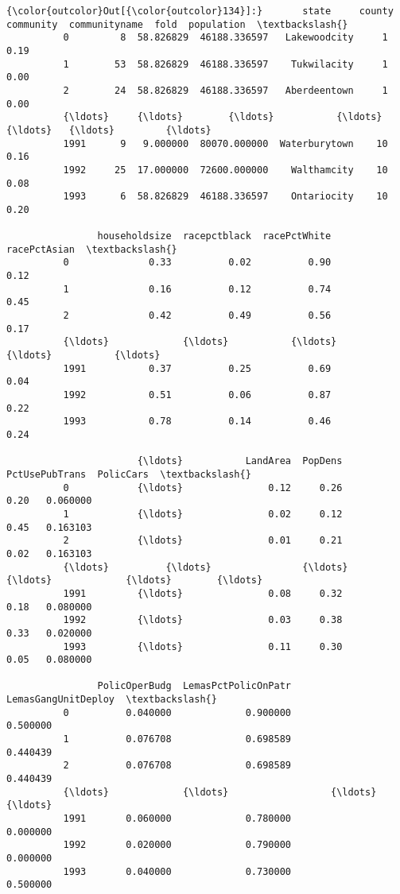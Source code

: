 \documentclass[11pt]{article}
\begin{document}
\begin{Verbatim}[commandchars=\\\{\}]
{\color{outcolor}Out[{\color{outcolor}134}]:}       state     county     community  communityname  fold  population  \textbackslash{}
          0         8  58.826829  46188.336597   Lakewoodcity     1        0.19   
          1        53  58.826829  46188.336597    Tukwilacity     1        0.00   
          2        24  58.826829  46188.336597   Aberdeentown     1        0.00   
          {\ldots}     {\ldots}        {\ldots}           {\ldots}            {\ldots}   {\ldots}         {\ldots}   
          1991      9   9.000000  80070.000000  Waterburytown    10        0.16   
          1992     25  17.000000  72600.000000    Walthamcity    10        0.08   
          1993      6  58.826829  46188.336597    Ontariocity    10        0.20   
          
                householdsize  racepctblack  racePctWhite  racePctAsian  \textbackslash{}
          0              0.33          0.02          0.90          0.12   
          1              0.16          0.12          0.74          0.45   
          2              0.42          0.49          0.56          0.17   
          {\ldots}             {\ldots}           {\ldots}           {\ldots}           {\ldots}   
          1991           0.37          0.25          0.69          0.04   
          1992           0.51          0.06          0.87          0.22   
          1993           0.78          0.14          0.46          0.24   
          
                       {\ldots}           LandArea  PopDens  PctUsePubTrans  PolicCars  \textbackslash{}
          0            {\ldots}               0.12     0.26            0.20   0.060000   
          1            {\ldots}               0.02     0.12            0.45   0.163103   
          2            {\ldots}               0.01     0.21            0.02   0.163103   
          {\ldots}          {\ldots}                {\ldots}      {\ldots}             {\ldots}        {\ldots}   
          1991         {\ldots}               0.08     0.32            0.18   0.080000   
          1992         {\ldots}               0.03     0.38            0.33   0.020000   
          1993         {\ldots}               0.11     0.30            0.05   0.080000   
          
                PolicOperBudg  LemasPctPolicOnPatr  LemasGangUnitDeploy  \textbackslash{}
          0          0.040000             0.900000             0.500000   
          1          0.076708             0.698589             0.440439   
          2          0.076708             0.698589             0.440439   
          {\ldots}             {\ldots}                  {\ldots}                  {\ldots}   
          1991       0.060000             0.780000             0.000000   
          1992       0.020000             0.790000             0.000000   
          1993       0.040000             0.730000             0.500000   
          

\end{Verbatim}
\end{document}

